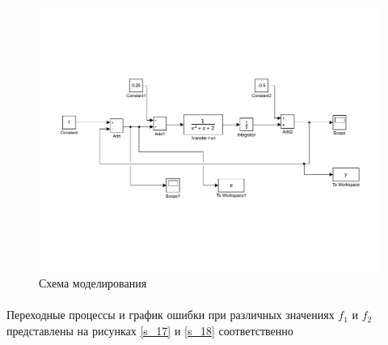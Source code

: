 \documentclass[a4paper,12pt]{article}
\begin{document}
	\begin{figure}[h]
		\renewcommand{\figurename}{Рисунок}
		\centering
		\includegraphics[width=6in]{VozmushenieMOD.pdf}
		\caption{Схема моделирования}
		\label{s_16}
	\end{figure}
	\newpage
	\paragraph {}Переходные процессы и график ошибки при различных значениях $f_1$ и $f_2$ представлены на рисунках \ref{s_17} и \ref{s_18} соответственно
	
\end{document}
